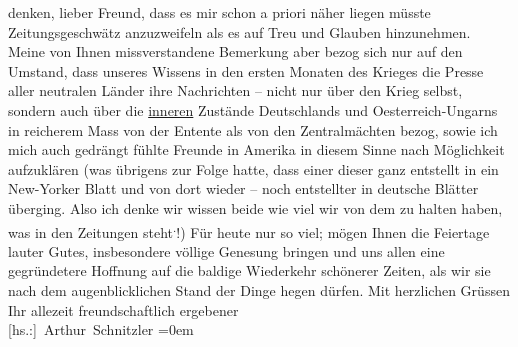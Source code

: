 \begin{ledgroupsized}[t]{13cm}
                    denken, lieber Freund, dass es mir schon a priori näher liegen müsste  Zeitungsgeschwätz anzuzweifeln als es
                    auf Treu und Glauben hinzunehmen. Meine von Ihnen missverstandene Bemerkung aber
                    bezog sich nur auf den Umstand, dass unseres Wissens in den {\pb}ersten Monaten des Krieges die Presse aller
                    neutralen Länder ihre Nachrichten – nicht nur über den Krieg selbst, sondern
                    auch über die \uline{inneren} Zustände Deutschlands und Oesterreich-Ungarns in reicherem Mass von der Entente als von den
                    Zentralmächten bezog, sowie ich mich auch gedrängt fühlte Freunde in Amerika in diesem Sinne nach Möglichkeit aufzuklären (was übrigens zur
                    Folge hatte, dass einer dieser \label{K_L02224_4v}\label{K_L02224_4h} ganz entstellt in ein New-Yorker Blatt und von dort
                    wieder \introOben{}–\introOben{} noch entstellter in deutsche Blätter
                    überging. Also ich denke wir wissen beide wie viel wir von dem zu halten haben,
                    was in den Zeitungen steht\substVorne{}\textsuperscript{.}\substDazwischen{}!\substHinten{}\introOben{})\introOben{}\pend
           \pstart
           Für heute nur so viel; mögen Ihnen die Feiertage lauter Gutes, insbesondere
                    völlige Genesung bringen und uns allen eine gegründetere Hoffnung auf die
                    baldige Wiederkehr schönerer Zeiten, als wir sie nach dem augenblicklichen Stand
                    der Dinge hegen dürfen.\pend
           \pstart
           Mit herzlichen Grüssen{\\[\baselineskip]}Ihr allezeit freundschaftlich ergebener{\\[\baselineskip]}\spacefill\mbox{{[}hs.:{]} Arthur Schnitzler}\pend
           \leftskip=0em{}\endnumbering{}\end{ledgroupsized}  \newcommand{\dateiname}{L02224}\newcommand{\titel}{Arthur Schnitzler an Georg Brandes, 22. 12. 1915}\newcommand{\editorInnen}{Martin Anton Müller und Gerd-Hermann Susen}
      